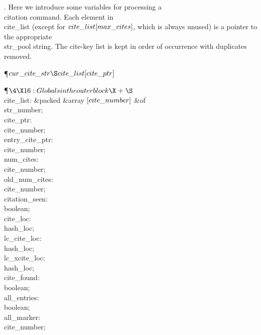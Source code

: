 .
Here we introduce some variables for processing a \.{\\citation}
command.  Each element in \\{cite\_list} (except for
$\\{cite\_list}[\\{max\_cites}]$, which is always unused) is a pointer to the
appropriate \\{str\_pool} string.  The cite-key list is kept in order of
occurrence with duplicates removed.

\Y\P\D {}$\\{cur\_cite\_str}\S\\{cite\_list}[\\{cite\_ptr}]$\par
\Y\P$\4\X16:Globals in the outer block\X\mathrel{+}\S$\6
\4\\{cite\_list}: \&{packed} \&{array} $[\\{cite\_number}]$ \1\&{of}\5
\\{str\_number};\2\6
\4\\{cite\_ptr}: \\{cite\_number};\6
\4\\{entry\_cite\_ptr}: \\{cite\_number};\6
\4\\{num\_cites}: \\{cite\_number};\6
\4\\{old\_num\_cites}: \\{cite\_number};\6
\4\\{citation\_seen}: \\{boolean};\6
\4\\{cite\_loc}: \\{hash\_loc};\6
\4\\{lc\_cite\_loc}: \\{hash\_loc};\6
\4\\{lc\_xcite\_loc}: \\{hash\_loc};\6
\4\\{cite\_found}: \\{boolean};\6
\4\\{all\_entries}: \\{boolean};\6
\4\\{all\_marker}: \\{cite\_number};\par
\fi

